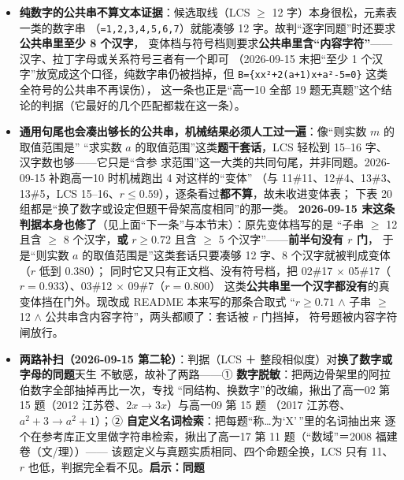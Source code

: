 \documentclass[a4paper,11pt]{article}
\providecommand{\tightlist}{%
  \setlength{\itemsep}{0pt}\setlength{\parskip}{0pt}}
\begin{document}
\begin{itemize}
  \begin{itemize}
  \tightlist
  \item
    2026-09-15 末并入高一19---21 后新增或改判的 7 组。
  \end{itemize}
\item
  \textbf{纯数字的公共串不算文本证据}：候选取线（LCS $\geqslant$ 12 字）本身很松，元素表一类的数字串
  （\texttt{=1,2,3,4,5,6,7}）就能凑够 12 字。故判``逐字同题''时还要求\textbf{公共串里至少 8 个汉字}，
  变体档与符号档则要求\textbf{公共串里含``内容字符''}------汉字、拉丁字母或关系符号三者有一个即可
  （2026-09-15 末把``至少 1 个汉字''放宽成这个口径，纯数字串仍被挡掉，但
  \texttt{B=\{x\textbar{}x²+2(a+1)x+a²-\allowbreak{}5=0\}} 这类全符号的公共串不再误伤），
  这一条也正是``高一10 全部 19 题无真题''这个结论的判据（它最好的几个匹配都栽在这一条）。
\item
  \textbf{通用句尾也会凑出够长的公共串，机械结果必须人工过一遍}：像``则实数 \(m\) 的取值范围是''
  ``求实数 \(a\) 的取值范围''这类\textbf{题干套话}，LCS 轻松到 15--16 字、汉字数也够------它只是``含参
  求范围''这一大类的共同句尾，并非同题。2026-09-15 补跑高一10 时机械跑出 4 对这样的``变体''
  （与 11\#11、12\#4、13\#3、13\#5，LCS 15--16、\(r\le0.59\)），逐条看过\textbf{都不算}，故未收进变体表；
  下表 20 组都是``换了数字或设定但题干骨架高度相同''的那一类。
  \textbf{2026-09-15 末这条判据本身也修了}（见上面``下一条''与本节末）：原先变体档写的是
  ``子串 $\geqslant$ 12 且含 $\geqslant$ 8 个汉字，\textbf{或} \(r\ge0.72\) 且含 $\geqslant$ 5 个汉字''------\textbf{前半句没有 \(r\) 门}，
  于是``则实数 \(a\) 的取值范围是''这类套话只要凑够 12 字、8 个汉字就被判成变体（\(r\) 低到 0.380）；
  同时它又只有正文档、没有符号档，把 02\#17 $\times$ 05\#17（\(r=0.933\)）、03\#12 $\times$ 09\#7（\(r=0.800\)）
  这类\textbf{公共串里一个汉字都没有}的真变体挡在门外。现改成 README 本来写的那条合取式
  ``\(r\ge0.71\) $\wedge$ 子串 $\geqslant$ 12 $\wedge$ 公共串含内容字符''，两头都顺了：套话被 \(r\) 门挡掉，
  符号题被内容字符闸放行。
\item
  \textbf{两路补扫（2026-09-15 第二轮）}：判据（LCS ＋ 整段相似度）对\textbf{换了数字或字母的同题}天生
  不敏感，故补了两路------① \textbf{数字脱敏}：把两边骨架里的阿拉伯数字全部抽掉再比一次，专找
  ``同结构、换数字''的改编，揪出了高一02 第 15 题（2012 江苏卷、\(2x\to3x\)）与高一09 第 15 题
  （2017 江苏卷、\(a^2+3\to a^2+1\)）；② \textbf{自定义名词检索}：把每题``称\ldots 为`X'\,''里的名词抽出来
  逐个在参考库正文里做字符串检索，揪出了高一17 第 11 题（``数域''＝2008 福建卷（文/理））------
  该题定义与真题实质相同、四个命题全换，LCS 只有 11、\(r\) 也低，判据完全看不见。\textbf{启示：同题
}
\end{itemize}
\end{document}
